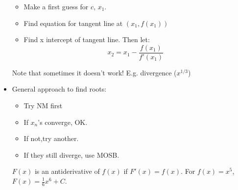 \begin{itemize}
    \begin{itemize}
        \item Make a first guess for $c$, $x_1$.
        \item Find equation for tangent line at $(x_1,f(x_1))$
        \item Find x intercept of tangent line. Then let:
        \begin{equation}
            x_2=x_1-\frac{f(x_1)}{f'(x_1)}
            \label{eq:}
        \end{equation}
    \end{itemize}
    \begin{warning}
        Note that sometimes it doesn't work! E.g. divergence ($x^{1/3}$)
    \end{warning}
    \item General approach to find roots:
    \begin{itemize}
        \item Try NM first
        \item If $x_n$'s converge, OK.
        \item If not,try another.
        \item If they still diverge, use MOSB.
    \end{itemize}
    \begin{definition}
        $F(x)$ is an antiderivative of $f(x)$ if $F'(x)=f(x)$. For $f(x)=x^5$, $F(x)=\frac{1}{6}x^6+C$.
    \end{definition}
\end{itemize}